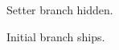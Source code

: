 \documentclass{article}
\newif\ifprobeset
\newif\ifprobeleft
\begin{document}
\ifprobeset Setter branch ships.\else Setter branch hidden.\fi

\ifprobeleft Initial branch hidden.\else Initial branch ships.\fi
\end{document}
